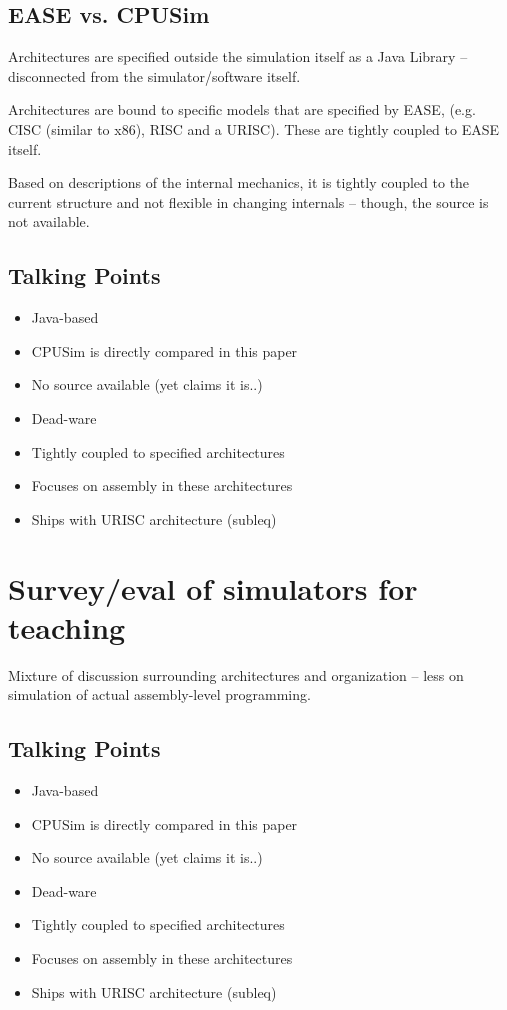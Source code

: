 \subsection{EASE vs. CPUSim}

Architectures are specified outside the simulation itself as a Java Library -- disconnected from the simulator/software itself. 

Architectures are bound to specific models that are specified by EASE, (e.g. CISC (similar to x86), RISC and a URISC). These are tightly coupled to EASE itself. 

Based on descriptions of the internal mechanics, it is tightly coupled to the current structure and not flexible in changing internals -- though, the source is not available. 


\subsection{Talking Points}

\begin{itemize}
\item Java-based
\item CPUSim is directly compared in this paper
\item No source available (yet claims it is..)
\item Dead-ware
\item Tightly coupled to specified architectures
\item Focuses on assembly in these architectures
\item Ships with URISC architecture (subleq)
\end{itemize}

\section{Survey/eval of simulators for teaching \cite{Nikolic2009}}

Mixture of discussion surrounding architectures and organization -- less on simulation of actual assembly-level programming.  


\subsection{Talking Points}

\begin{itemize}
\item Java-based
\item CPUSim is directly compared in this paper
\item No source available (yet claims it is..)
\item Dead-ware
\item Tightly coupled to specified architectures
\item Focuses on assembly in these architectures
\item Ships with URISC architecture (subleq)
\end{itemize}

